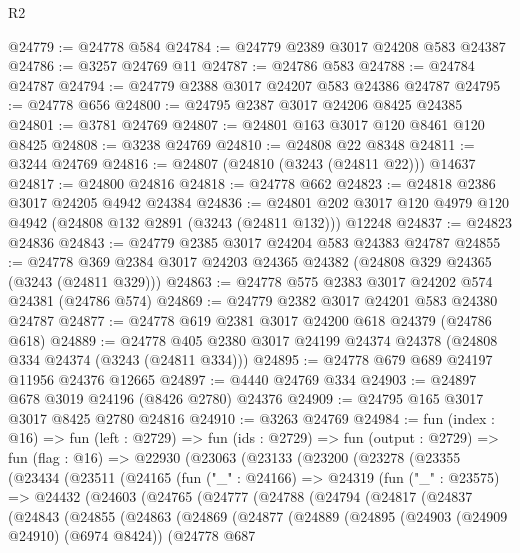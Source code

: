 \begin{lexlean}{R2}
\begin{coremodule}
@24779 := @24778 @584
@24784 := @24779 @2389 @3017 @24208 @583 @24387
@24786 := @3257 @24769 @11
@24787 := @24786 @583
@24788 := @24784 @24787
@24794 := @24779 @2388 @3017 @24207 @583 @24386 @24787
@24795 := @24778 @656
@24800 := @24795 @2387 @3017 @24206 @8425 @24385
@24801 := @3781 @24769
@24807 := @24801 @163 @3017 @120 @8461 @120 @8425
@24808 := @3238 @24769
@24810 := @24808 @22 @8348
@24811 := @3244 @24769
@24816 := @24807 (@24810 (@3243 (@24811 @22))) @14637
@24817 := @24800 @24816
@24818 := @24778 @662
@24823 := @24818 @2386 @3017 @24205 @4942 @24384
@24836 := @24801 @202 @3017 @120 @4979 @120 @4942 (@24808 @132 @2891 (@3243 (@24811 @132))) @12248
@24837 := @24823 @24836
@24843 := @24779 @2385 @3017 @24204 @583 @24383 @24787
@24855 := @24778 @369 @2384 @3017 @24203 @24365 @24382 (@24808 @329 @24365 (@3243 (@24811 @329)))
@24863 := @24778 @575 @2383 @3017 @24202 @574 @24381 (@24786 @574)
@24869 := @24779 @2382 @3017 @24201 @583 @24380 @24787
@24877 := @24778 @619 @2381 @3017 @24200 @618 @24379 (@24786 @618)
@24889 := @24778 @405 @2380 @3017 @24199 @24374 @24378 (@24808 @334 @24374 (@3243 (@24811 @334)))
@24895 := @24778 @679 @689 @24197 @11956 @24376 @12665
@24897 := @4440 @24769 @334
@24903 := @24897 @678 @3019 @24196 (@8426 @2780) @24376
@24909 := @24795 @165 @3017 @3017 @8425 @2780 @24816
@24910 := @3263 @24769
@24984 := fun (index : @16) =>
  fun (left : @2729) =>
  fun (ids : @2729) =>
  fun (output : @2729) =>
  fun (flag : @16) =>
  @22930
    (@23063
      (@23133
        (@23200
          (@23278
            (@23355
              (@23434
                (@23511
                  (@24165
                    (fun ("_" : @24166) =>
                    @24319
                      (fun ("_" : @23575) =>
                      @24432
                        (@24603
                          (@24765
                            (@24777
                              (@24788
                                (@24794
                                  (@24817
                                    (@24837
                                      (@24843
                                        (@24855
                                          (@24863
                                            (@24869
                                              (@24877
                                                (@24889
                                                  (@24895
                                                    (@24903 (@24909 @24910) (@6974 @8424))
                                                    (@24778
                                                      @687

\end{coremodule}
\end{lexlean}
